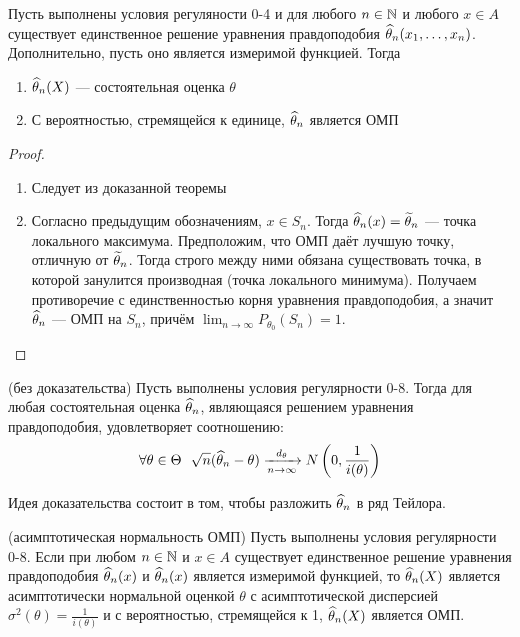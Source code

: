 \begin{corollary}
	Пусть выполнены условия регуляности 0-4 и для любого $n \in \mathbb{N}$ и любого $x \in A$ существует единственное решение уравнения правдоподобия $\widehat{\theta}_n(x_1, \ldots, x_n)$. Дополнительно, пусть оно является измеримой функцией. Тогда
	\begin{enumerate}
		\item $\widehat{\theta}_n(X)$ --- состоятельная оценка $\theta$
		
		\item С вероятностью, стремящейся к единице, $\widehat{\theta}_n$ является ОМП
	\end{enumerate}
\end{corollary}

\begin{proof}~
	\begin{enumerate}
		\item Следует из доказанной теоремы
		
		\item Согласно предыдущим обозначениям, $x \in S_n$. Тогда $\widehat{\theta}_n(x) = \widetilde{\theta}_n$ --- точка локального максимума. Предположим, что ОМП даёт лучшую точку, отличную от $\widetilde{\theta}_n$. Тогда строго между ними обязана существовать точка, в которой занулится производная (точка локального минимума). Получаем противоречие с единственностью корня уравнения правдоподобия, а значит $\widehat{\theta}_n$ --- ОМП на $S_n$, причём $\lim_{n \to \infty} P_{\theta_0}(S_n) = 1$.
	\end{enumerate}
\end{proof}

\begin{theorem} (без доказательства)
	Пусть выполнены условия регулярности 0-8. Тогда для любая состоятельная оценка $\widehat{\theta}_n$, являющаяся решением уравнения правдоподобия, удовлетворяет соотношению:
	\[
		\forall \theta \in \Theta\ \ \sqrt{n}(\wh{\theta}_n - \theta) \xrightarrow[n \to \infty]{d_\theta} N\ps{0, \frac{1}{i(\theta)}}
	\]
\end{theorem}

\begin{note}
	Идея доказательства состоит в том, чтобы разложить $\widehat{\theta}_n$ в ряд Тейлора.
\end{note}

\begin{corollary} (асимптотическая нормальность ОМП)
	Пусть выполнены условия регулярности 0-8. Если при любом $n \in \mathbb{N}$ и $x \in A$ существует единственное решение уравнения правдоподобия $\widehat{\theta}_n(x)$ и $\widehat{\theta}_n(x)$ является измеримой функцией, то $\widehat{\theta}_n(X)$ является асимптотически нормальной оценкой $\theta$ с асимптотической дисперсией $\sigma^2(\theta) = \frac{1}{i(\theta)}$ и с вероятностью, стремящейся к 1, $\widehat{\theta}_n(X)$ является ОМП.
\end{corollary}

